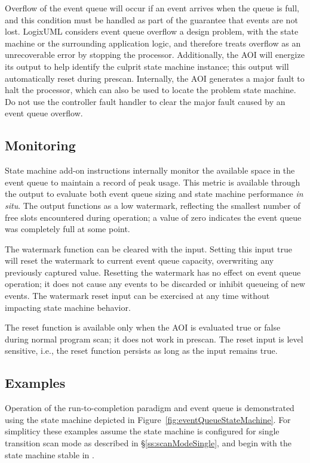 Overflow of the event queue will occur if an event arrives when the queue
is full, and this condition must be handled as part of the guarantee that
events are not lost.
LogixUML considers event queue overflow a design problem,
with the state machine or the surrounding application logic, and
therefore treats overflow as an unrecoverable error by stopping the processor.
Additionally, the AOI will energize its 
output to help identify the culprit state machine instance; this output
will automatically reset during prescan. Internally, the AOI generates
a major fault to halt the processor, which can also be used to locate the
problem state machine. Do not use the controller fault handler
to clear the major fault caused by an event queue overflow.


\subsection{Monitoring}

State machine add-on instructions internally monitor the available space in
the event queue to maintain a record of peak usage. This metric is
available through the  output
to evaluate both event queue sizing and state machine performance
\emph{in situ}. The output functions as a low
watermark, reflecting the smallest number of free slots encountered during
operation; a value of zero indicates the event queue was completely
full at some point.

The watermark function can be cleared with the
 input. Setting this input true will
reset the watermark to current event queue capacity, overwriting any
previously captured value. Resetting the watermark has no effect on event
queue operation; it does not cause any events to be discarded or inhibit
queueing of new events. The watermark reset input can be exercised at any
time without impacting state machine behavior.

The reset function is available only when the
AOI is evaluated true or false during normal program scan; it does not
work in prescan. The reset input is level sensitive, i.e., the reset
function persists as long as the input remains true.


\subsection{Examples}

Operation of the run-to-completion paradigm and event queue is
demonstrated using the state machine depicted in
Figure~\ref{fig:eventQueueStateMachine}. For simpliticy these examples
assume the state machine is configured for single transition scan mode
as described in \S\ref{ss:scanModeSingle},
and begin with the state machine stable in .

